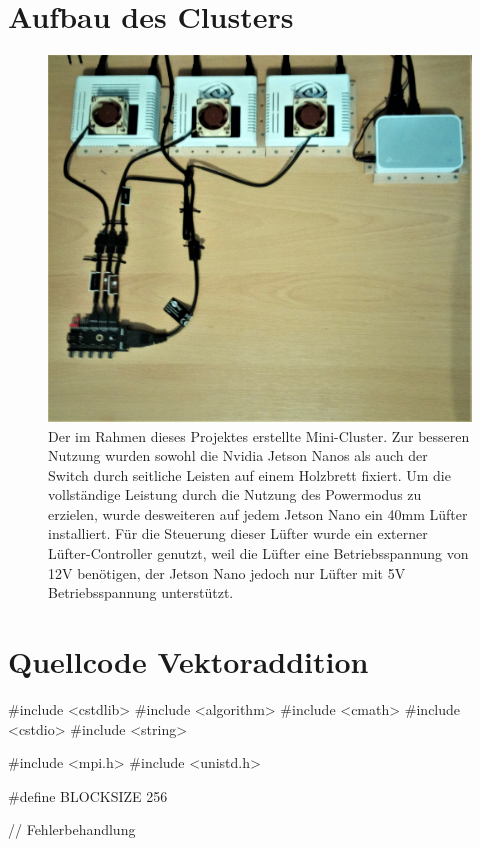 \documentclass[doktyp=semarbeit, sprache=german]{TUBAFarbeiten}
\begin{document}
\begin{appendix} 
\section{Aufbau des Clusters}
\begin{figure}
	\centering
	\includegraphics[width=1.0\textwidth]{images/Foto1.jpg}
	\caption{Der im Rahmen dieses Projektes erstellte Mini-Cluster. Zur besseren Nutzung wurden sowohl die Nvidia Jetson Nanos als auch der Switch durch seitliche Leisten auf einem Holzbrett fixiert. Um die vollständige Leistung durch die Nutzung des Powermodus zu erzielen, wurde desweiteren auf jedem Jetson Nano ein 40mm Lüfter installiert. Für die Steuerung dieser Lüfter wurde ein externer Lüfter-Controller genutzt, weil die Lüfter eine Betriebsspannung von 12V benötigen, der Jetson Nano jedoch nur Lüfter mit 5V Betriebsspannung unterstützt.}
	\label{img:foto1}
\end{figure}
\newpage
\section{Quellcode Vektoraddition}
\begin{CPP}
#include <cstdlib>
#include <algorithm>
#include <cmath>
#include <cstdio>
#include <string>

#include <mpi.h>
#include <unistd.h>

#define BLOCKSIZE 256

// Fehlerbehandlung


\end{CPP}
\end{appendix}
\end{document}
